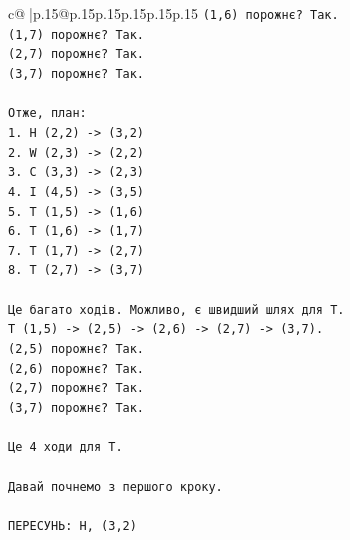 \documentclass{article}
\begin{document}
{\begin{supertabular}{c@{$\;$}|p{.15\linewidth}@{}p{.15\linewidth}p{.15\linewidth}p{.15\linewidth}p{.15\linewidth}p{.15\linewidth}}
{{{\texttt{(1,6) порожнє? Так.} \\
\texttt{(1,7) порожнє? Так.} \\
\texttt{(2,7) порожнє? Так.} \\
\texttt{(3,7) порожнє? Так.} \\
\\ 
\texttt{Отже, план:} \\
\texttt{1. H (2,2) {-}> (3,2)} \\
\texttt{2. W (2,3) {-}> (2,2)} \\
\texttt{3. C (3,3) {-}> (2,3)} \\
\texttt{4. I (4,5) {-}> (3,5)} \\
\texttt{5. T (1,5) {-}> (1,6)} \\
\texttt{6. T (1,6) {-}> (1,7)} \\
\texttt{7. T (1,7) {-}> (2,7)} \\
\texttt{8. T (2,7) {-}> (3,7)} \\
\\ 
\texttt{Це багато ходів. Можливо, є швидший шлях для T.} \\
\texttt{T (1,5) {-}> (2,5) {-}> (2,6) {-}> (2,7) {-}> (3,7).} \\
\texttt{(2,5) порожнє? Так.} \\
\texttt{(2,6) порожнє? Так.} \\
\texttt{(2,7) порожнє? Так.} \\
\texttt{(3,7) порожнє? Так.} \\
\\ 
\texttt{Це 4 ходи для T.} \\
\\ 
\texttt{Давай почнемо з першого кроку.} \\
\\ 
\texttt{ПЕРЕСУНЬ: H, (3,2)} \\
            }
        }
    }
     \\ \\


\end{supertabular}}
\end{document}
